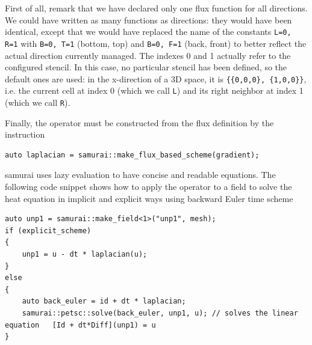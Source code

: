 First of all, remark that we have declared only one flux function for all directions.
We could have written as many functions as directions:
they would have been identical, except that we would have replaced the name of the constants
\verb!L=0, R=1! with \verb!B=0, T=1! (bottom, top) and \verb!B=0, F=1! (back, front) to better reflect the actual direction currently managed.
The indexes 0 and 1 actually refer to the configured stencil.
In this case, no particular stencil has been defined, so the default ones are used: in the x-direction of a 3D space,
it is \verb!{{0,0,0}, {1,0,0}}!, i.e. the current cell at index 0 (which we call \verb!L!) and its right neighbor at index 1 (which we call \verb!R!).

Finally, the operator must be constructed from the flux definition by the instruction

\begin{listing}[ht]
    \begin{verbatim}
auto laplacian = samurai::make_flux_based_scheme(gradient);
\end{verbatim}
\end{listing}

samurai uses lazy evaluation to have concise and readable equations. The following code snippet shows how to apply the operator to a field to solve the heat equation in implicit and explicit ways using backward Euler time scheme

\begin{listing}[ht]
    \begin{verbatim}
auto unp1 = samurai::make_field<1>("unp1", mesh);
if (explicit_scheme)
{
    unp1 = u - dt * laplacian(u);
}
else
{
    auto back_euler = id + dt * laplacian;
    samurai::petsc::solve(back_euler, unp1, u); // solves the linear equation   [Id + dt*Diff](unp1) = u
}
\end{verbatim}
\end{listing}

